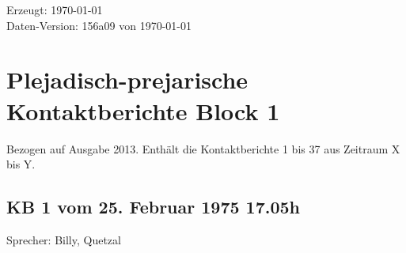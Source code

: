 \documentclass[ngerman,10pt]{book}
\begin{document}
\noindent Erzeugt: \today \\
Daten-Version: 156a09 von \today

\newpage



\tableofcontents



\mainmatter

\chapter*{Plejadisch-prejarische Kontaktberichte Block 1}

Bezogen auf Ausgabe 2013. Enthält die Kontaktberichte 1 bis 37 aus Zeitraum X bis Y.



\section{KB 1 vom 25. Februar 1975 17.05h}

Sprecher: Billy, Quetzal
\end{document}
